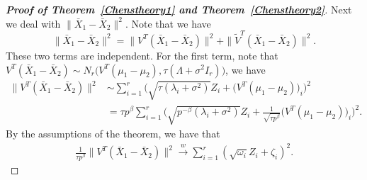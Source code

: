 \documentclass[review]{elsarticle}
\theoremstyle{plain}
\theoremstyle{definition}
\theoremstyle{remark}
\begin{document}
\begin{proof}[\textbf{Proof of Theorem~\ref{Chenstheory1} and Theorem~\ref{Chenstheory2}}]
    Next we deal with $\|\bar{X}_1-\bar{X}_2\|^2$.
    Note that we have
    $$
    \|\bar{X}_1-\bar{X}_2\|^2=
    \|V^T(\bar{X}_1-\bar{X}_2)\|^2+
    \|\tilde{V}^T(\bar{X}_1-\bar{X}_2)\|^2.
    $$
    These two terms are independent.
    For the first term, note that $V^T(\bar{X}_1-\bar{X}_2)\sim N_r\big(V^T (\mu_1-\mu_2),\tau (\Lambda+\sigma^2 I_r)\big)$, we have
    $$
    \begin{aligned}
        \|V^T(\bar{X}_1-\bar{X}_2)\|^2&\sim
        \sum_{i=1}^r \Big(\sqrt{\tau (\lambda_i+\sigma^2)}Z_i+\big(V^T (\mu_1-\mu_2)\big)_i \Big)^2\\
        &=\tau p^{\beta}
        \sum_{i=1}^r
        \Big( \sqrt{p^{-\beta}(\lambda_i+\sigma^2)}Z_i+\frac{1}{\sqrt{\tau p^{\beta}}}\big(V^T (\mu_1-\mu_2)\big)_i \Big)^2.
    \end{aligned}
    $$
    By the assumptions of the theorem,  we have that
    \begin{equation}\label{eq:kkk2}
    \begin{aligned}
        \frac{1}{\tau p^{\beta}}\|V^T(\bar{X}_1-\bar{X}_2)\|^2
        \xrightarrow{w}
        \sum_{i=1}^r (\sqrt{\omega_i} Z_i+\zeta_i)^2.
    \end{aligned}
    \end{equation}


\end{proof}
\end{document}
